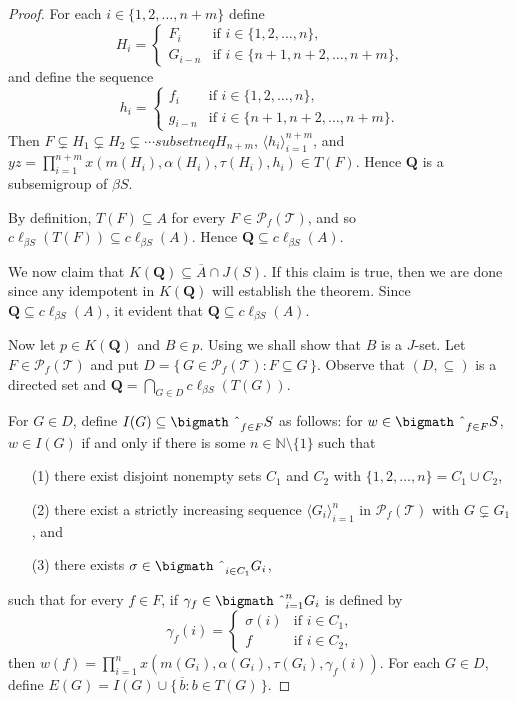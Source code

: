 \documentclass[12pt,showtrims]{memoir}
\theoremstyle{plain}
\theoremstyle{definition}
\newcommand{\la}{\langle}
\newcommand{\ra}{\rangle}
\newcommand{\bbN}{\mathbb{N}}
\newcommand{\calT}{\mathcal{T}}
\newcommand{\Pf}{\mathcal{P}_f}
\newcommand{\bigtimes}{\hbox{\bigmath \char'2}}
\begin{document}
\begin{proof}
  For each $i \in \{1, 2, \ldots, n+m\}$ define 
  \[
    H_i = 
    \begin{cases}
      F_i & \mbox{if $i \in \{1, 2, \ldots, n\}$,} \\
      G_{i-n} & \mbox{if $i \in \{n+1, n+2, \ldots, n+m\}$,}
    \end{cases}
  \]
  and define the sequence
  \[
    h_i =
    \begin{cases}
      f_i & \mbox{if $i \in \{1, 2, \ldots, n\}$,} \\
      g_{i-n} & \mbox{if $i \in \{n+1, n+2, \ldots, n+m\}$.}
    \end{cases}
  \]
  Then $F \subsetneq H_1 \subsetneq H_2 \subsetneq \cdots subsetneq H_{n+m}$, $\la h_i \ra_{i=1}^{n+m}$, and $yz = \prod_{i=1}^{n+m} x(m(H_i), \alpha(H_i), \tau(H_i), h_i) \in T(F)$. 
  Hence $\mathbf{Q}$ is a subsemigroup of $\beta S$. 

  By definition, $T(F) \subseteq A$ for every $F \in \Pf(\calT)$, and so $c\ell_{\beta S} (T(F)) \subseteq c\ell_{\beta S} (A)$. 
  Hence $\mathbf{Q} \subseteq c\ell_{\beta S} (A)$.

  We now claim that $K(\mathbf{Q}) \subseteq \overline{A} \cap J(S)$. 
  If this claim is true, then we are done since any idempotent in $K(\mathbf{Q})$ will establish the theorem. 
  Since $\mathbf{Q} \subseteq c\ell_{\beta S} (A)$, it evident that $\mathbf{Q} \subseteq c\ell_{\beta S} (A)$. 

  Now let $p \in K(\mathbf{Q})$ and $B \in p$.
  Using \cite[Lemma 14.9]{Hindman:1998fk} we shall show that $B$ is a $J$-set. 
  Let $F \in \Pf(\calT)$ and put $D = \{\, G \in \Pf(\calT) : F \subseteq G \,\}$. 
  Observe that $(D, \subseteq)$ is a directed set and $\mathbf{Q} = \bigcap_{G \in D} c\ell_{\beta S} (T(G))$.

  For $G \in D$, define $I(G) \subseteq \bigtimes_{f \in F} S$ as follows: for $w \in \bigtimes_{f \in F} S$, $w \in I(G)$ if and only if there is some $n \in \bbN \setminus \{1\}$ such that 
  \begin{itemize}
    \item[(1)]
      there exist disjoint nonempty sets $C_1$ and $C_2$ with $\{1, 2, \ldots, n\} = C_1 \cup C_2$, 
      
    \item[(2)]
      there exist a strictly increasing sequence $\la G_i \ra_{i=1}^n$ in $\Pf(\calT)$ with $G \subsetneq G_1$, and

    \item[(3)]
      there exists $\sigma \in \bigtimes_{i \in C_1} G_i$, 
  \end{itemize}
such that for every $f \in F$, if $\gamma_f \in \bigtimes_{i=1}^n G_i$ is defined by 
  \[
    \gamma_f(i) = 
    \begin{cases}
      \sigma(i) & \mbox{if $i \in C_1$,} \\
      f & \mbox{if $i \in C_2$,} 
    \end{cases}
  \]
then $w(f) = \prod_{i=1}^n x(m(G_i), \alpha(G_i), \tau(G_i), \gamma_f(i))$.
  For each $G \in D$, define $E(G) = I(G) \cup \{\, \overline{b} : b \in T(G) \,\}$. 


\end{proof}
\end{document}
